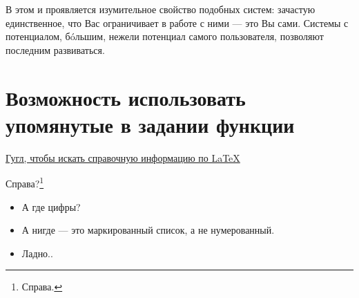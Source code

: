 \documentclass[a4paper,12pt]{article} %
\begin{document}
В этом и проявляется изумительное свойство подобных систем: зачастую единственное, что Вас ограничивает в работе с ними --- это Вы сами.
Системы с потенциалом, б\'oльшим, нежели потенциал самого пользователя, позволяют последним развиваться.

\section{Возможность использовать упомянутые в задании функции}

\begin{center}
  \href{https://www.google.com/}{Гугл, чтобы искать справочную информацию по \LaTeX}
\end{center}

\begin{flushright}
  \huge{Справа?}\footnote{Справа.}
\end{flushright}

\begin{itemize}
  \item А где цифры?
  \item А нигде --- это маркированный список, а не нумерованный.
  \item \tiny{Ладно..}
\end{itemize}
\end{document}
